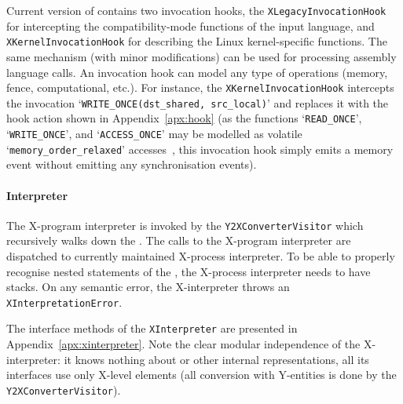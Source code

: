 Current version of \porthos[2] contains two invocation hooks, the \texttt{XLegacyInvocationHook} for intercepting the compatibility-mode functions of the \porthos[2] input language, and \texttt{XKernelInvocationHook} for describing the Linux kernel-specific functions.
The same mechanism (with minor modifications) can be used for processing assembly language calls.
An invocation hook can model any type of operations (memory, fence, computational, etc.).
For instance, the \texttt{XKernelInvocationHook} intercepts the invocation `\lstinline{WRITE_ONCE(dst_shared, src_local)}' and replaces it with the hook action shown in Appendix~\ref{apx:hook} (as the functions `\lstinline{READ_ONCE}', `\lstinline{WRITE_ONCE}', and `\lstinline{ACCESS_ONCE}' may be modelled as volatile `\lstinline{memory_order_relaxed}' accesses~\cite{kernel2c}, this invocation hook simply emits a memory event without emitting any synchronisation events).


\paragraph{Interpreter}

The X-program interpreter is invoked by the \texttt{Y2XConverterVisitor} which recursively walks down the \ytree{}.
The calls to the X-program interpreter are dispatched to currently maintained X-process interpreter.
To be able to properly recognise nested statements of the \ytree{}, the X-process interpreter needs to have stacks.
On any semantic error, the X-interpreter throws an \texttt{XInterpretationError}.

The interface methods of the \texttt{XInterpreter} are presented in Appendix~\ref{apx:xinterpreter}.
Note the clear modular independence of the X-interpreter: it knows nothing about \ytree{} or other internal representations, all its interfaces use only X-level elements (all conversion with Y-entities is done by the \texttt{Y2XConverterVisitor}).

